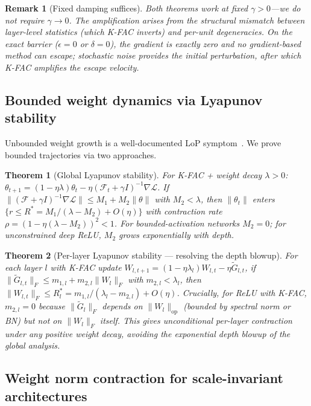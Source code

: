 \documentclass{article}
\newtheorem{theorem}{Theorem}
\newtheorem{remark}{Remark}
\newcommand{\cL}{\mathcal{L}}
\begin{document}
\begin{remark}[Fixed damping suffices]
Both theorems work at \emph{fixed} $\gamma > 0$---we do not require $\gamma \to 0$. The amplification arises from the structural mismatch between layer-level statistics (which K-FAC inverts) and per-unit degeneracies. On the \emph{exact} barrier ($\epsilon = 0$ or $\delta = 0$), the gradient is exactly zero and no gradient-based method can escape; stochastic noise provides the initial perturbation, after which K-FAC amplifies the escape velocity.
\end{remark}

\subsection{Bounded weight dynamics via Lyapunov stability}
\label{sec:bounded}

Unbounded weight growth is a well-documented LoP symptom~\citep{dohare2024loss, wu2026rank}. We prove bounded trajectories via two approaches.

\begin{theorem}[Global Lyapunov stability]
\label{thm:lyapunov}
For K-FAC + weight decay $\lambda > 0$: $\theta_{t+1} = (1-\eta\lambda)\theta_t - \eta(\mathcal{F}_t + \gamma I)^{-1}\nabla\cL$. If $\|(\mathcal{F}+\gamma I)^{-1}\nabla\cL\| \leq M_1 + M_2\|\theta\|$ with $M_2 < \lambda$, then $\|\theta_t\|$ enters $\{r \leq R^* = M_1/(\lambda - M_2) + O(\eta)\}$ with contraction rate $\rho = (1-\eta(\lambda-M_2))^2 < 1$. For bounded-activation networks $M_2 = 0$; for unconstrained deep ReLU, $M_2$ grows exponentially with depth.
\end{theorem}

\begin{theorem}[Per-layer Lyapunov stability --- resolving the depth blowup]
\label{thm:lyapunov_layer}
For each layer $l$ with K-FAC update $W_{l,t+1} = (1-\eta\lambda_l)W_{l,t} - \eta\tilde{G}_{l,t}$, if $\|\tilde{G}_{l,t}\|_F \leq m_{1,l} + m_{2,l}\|W_l\|_F$ with $m_{2,l} < \lambda_l$, then $\|W_{l,t}\|_F \leq R_l^* = m_{1,l}/(\lambda_l - m_{2,l}) + O(\eta)$. Crucially, for ReLU with K-FAC, $m_{2,l} = 0$ because $\|\tilde{G}_l\|_F$ depends on $\|W_l\|_{\mathrm{op}}$ (bounded by spectral norm or BN) but not on $\|W_l\|_F$ itself. This gives unconditional per-layer contraction under any positive weight decay, avoiding the exponential depth blowup of the global analysis.
\end{theorem}

\subsection{Weight norm contraction for scale-invariant architectures}
\label{sec:weight_contraction}
\end{document}
